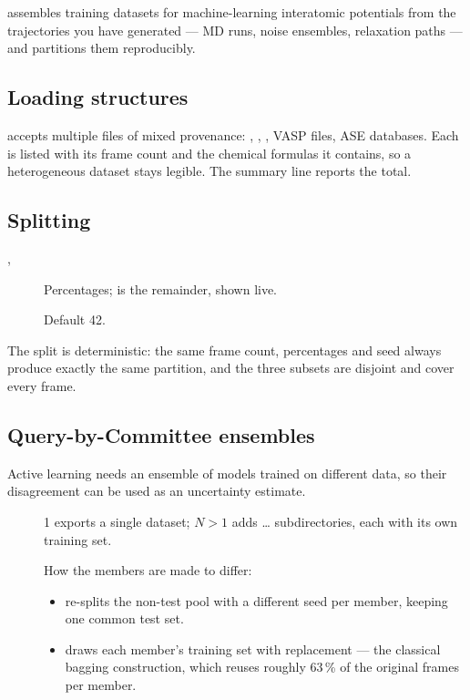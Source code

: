 \menusep{} assembles training
datasets for machine-learning interatomic potentials from the trajectories
you have generated --- MD runs, noise ensembles, relaxation paths --- and
partitions them reproducibly.

\subsection{Loading structures}

 accepts multiple files of mixed provenance:
, , , VASP files, ASE databases. Each
is listed with its frame count and the chemical formulas it contains, so a
heterogeneous dataset stays legible. The summary line reports the total.

\subsection{Splitting}

\begin{description}
  \item[, ] Percentages;  is the
    remainder, shown live.
  \item[] Default 42.
\end{description}

The split is deterministic: the same frame count, percentages and seed
always produce exactly the same partition, and the three subsets are
disjoint and cover every frame.

\subsection{Query-by-Committee ensembles}

Active learning needs an ensemble of models trained on different data, so
their disagreement can be used as an uncertainty estimate.

\begin{description}
  \item[] 1 exports a single dataset; $N > 1$ adds
    \ldots{} subdirectories, each with
    its own training set.
  \item[] How the members are made to differ:
    \begin{itemize}
      \item {} re-splits the non-test pool
        with a different seed per member, keeping one common test set.
      \item {} draws each
        member's training set with replacement --- the classical bagging
        construction, which reuses roughly 63\,\% of the original frames
        per member.
    \end{itemize}
\end{description}

